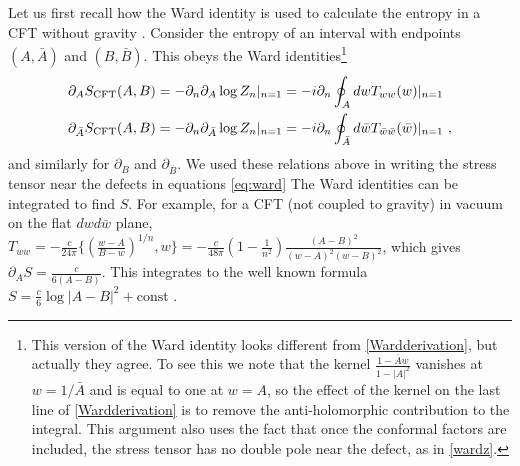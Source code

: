 \documentclass[11pt,oneside,letterpaper]{article}
\newcommand{\p}{\partial}
\newcommand{\f}{\frac}
\let\l=\lambda \let\m=\mu \let\n=\nu \let\x=\xi \let\p=\phi \let\r=v
\let\w=\omega \let\G=\Gamma \let\D=\Delta \let\Q=\Theta \let\L=\Lambda
\let\f=\frac
\renewcommand{\p}{\partial}
\numberwithin{equation}{section}
\def\m{{\mu}}
\def\w{{\omega}}
\def\n{{\nu}}
\def\p{{\phi}}
\def\L{\Lambda}
\def\G{{\Gamma}}
\def\D{{\Delta}}
\def\r{\rightarrow}
\def\f {\frac}
\def\l{\left}
\def\r{\right}
\def\w{\bar{w}}
\def\x{\bar{x}}
\renewcommand{\p}{\partial}
\begin{document}
\begin{spacing}{1.1}
Let us first recall how the Ward identity is used to calculate the entropy in a CFT without gravity \cite{Calabrese:2004eu,Calabrese:2009qy}. Consider the entropy of an interval with endpoints $(A,\bar{A})$ and $(B,\bar{B})$. This obeys the Ward identities\footnote{This version of the Ward identity looks different from \eqref{Wardderivation}, but actually they agree. To see this we note that the kernel $\frac{1-\bar{A}w}{1-|A|^2}$ vanishes at $w = 1/\bar{A}$ and is equal to one at $w = A$, so the effect of the kernel on the last line of \eqref{Wardderivation} is to remove the anti-holomorphic contribution to the integral. This argument also uses the fact that once the conformal factors are included, the stress tensor has no double pole near the defect, as in \eqref{wardz}.}
\begin{align}
\p_A S_{\rm CFT}(A,B) &= -\p_n \p_A \log Z_n |_{n=1} 
= -i\p_n \oint_A dw T_{ww}(w) |_{n=1} \\
\p_{\bar{A}} S_{\rm CFT}(A,B) &= -\p_n \p_{\bar{A}}  \log Z_n |_{n=1} 
= - i\p_n \oint_{\bar{A}} d\bar{w}  T_{\w\w}(\bar{w}) |_{n=1}\ , 
\end{align}
and similarly for $\p_B$ and $\p_{\bar{B}}$. We used these relations above in writing the stress tensor near the defects in equations \eqref{eq:ward} The Ward identities can be integrated to find $S$. For example, for a CFT (not coupled to gravity) in vacuum on the flat $dw d\bar{w}$ plane, $T_{ww} = -\frac{c}{24\pi}\{ \left( \frac{w-A}{B-w} \right)^{1/n}, w\}=-\f{c}{48\pi}\l(1-\f{1}{n^2}\r)\f{(A-B)^2}{(w-A)^2(w-B)^2}$, which gives $\p_A S = \frac{c}{6(A-B)}$. This integrates to the well known formula $S = \frac{c}{6}\log|A-B|^2 + \mbox{const}$ \cite{Calabrese:2004eu, Calabrese:2009qy}.


\end{spacing}
\end{document}
